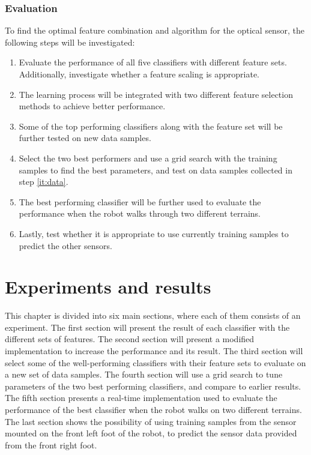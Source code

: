 \documentclass[USenglish]{ifimaster}  %
\begin{document}
\clearpage
\subsection{Evaluation}
To find the optimal feature combination and algorithm for the optical sensor, the following steps will be investigated:

\begin{enumerate}
	\item Evaluate the performance of all five classifiers with different feature sets. Additionally, investigate whether a feature scaling is appropriate.  
	\item The learning process will be integrated with two different feature selection methods to achieve better performance. 
	\item \label{it:data} Some of the top performing classifiers along with the feature set will be further tested on new data samples.
	\item Select the two best performers and use a grid search with the training samples to find the best parameters, and test on data samples collected in step \ref{it:data}.
	\item The best performing classifier will be further used to evaluate the performance when the robot walks through two different terrains.
	\item Lastly, test whether it is appropriate to use currently training samples to predict the other sensors. 
\end{enumerate}


\chapter{Experiments and results}                     %
This chapter is divided into six main sections, where each of them consists of an experiment. The first section will present the result of each classifier with the different sets of features. The second section will present a modified implementation to increase the performance and its result. The third section will select some of the well-performing classifiers with their feature sets to evaluate on a new set of data samples. The fourth section will use a grid search to tune parameters of the two best performing classifiers, and compare to earlier results. The fifth section presents a real-time implementation used to evaluate the performance of the best classifier when the robot walks on two different terrains. The last section shows the possibility of using training samples from the sensor mounted on the front left foot of the robot, to predict the sensor data provided from the front right foot.
 
\end{document}
